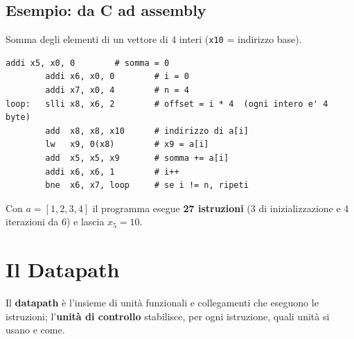 \subsection{Esempio: da C ad assembly}
Somma degli elementi di un vettore di 4 interi (\texttt{x10} = indirizzo base).
\begin{lstlisting}[numbers=none, caption={Somma di un vettore in assembly RISC-V (eseguita su un simulatore)}]
        addi x5, x0, 0        # somma = 0
        addi x6, x0, 0        # i = 0
        addi x7, x0, 4        # n = 4
loop:   slli x8, x6, 2        # offset = i * 4  (ogni intero e' 4 byte)
        add  x8, x8, x10      # indirizzo di a[i]
        lw   x9, 0(x8)        # x9 = a[i]
        add  x5, x5, x9       # somma += a[i]
        addi x6, x6, 1        # i++
        bne  x6, x7, loop     # se i != n, ripeti
\end{lstlisting}
Con $a = [1,2,3,4]$ il programma esegue \textbf{27 istruzioni} (3 di inizializzazione e 4 iterazioni da 6) e lascia $x_5 = 10$.

\section{Il Datapath}
Il \textbf{datapath} è l'insieme di unità funzionali e collegamenti che eseguono le istruzioni; l'\textbf{unità di controllo} stabilisce, per ogni istruzione, quali unità si usano e come.


